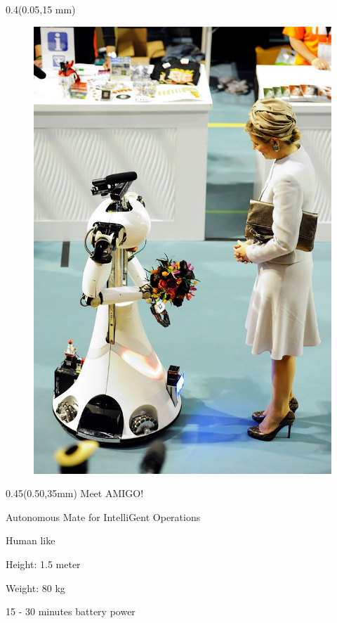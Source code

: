 \documentclass[aspectratio=43]{beamer}
\newcommand{\TULeftMargin}{0.05\paperwidth}
\newcommand{\TULeftWidth}{0.4\paperwidth}
\newcommand{\TURightMargin}{0.50\paperwidth}
\newcommand{\TURightWidth}{0.45\paperwidth}
\begin{document}
	\begin{frame}
	
		\begin{textblock*}{\TULeftWidth}(\TULeftMargin,15	mm)
			\begin{figure}
				\centering
				\includegraphics[width=0.8\linewidth]{[TechUnitedStyle]/Figures/Maxima}
			\end{figure}
		\end{textblock*}
		
		\begin{textblock*}{\TURightWidth}(\TURightMargin,35mm)
			Meet AMIGO! 
			\begin{TechUnitedItems}
				\item Autonomous Mate for IntelliGent Operations
				\item Human like
				\item Height: 1.5 meter
				\item Weight: 80 kg
				\item 15 - 30 minutes battery power
			
			\end{TechUnitedItems}
			
	\end{textblock*}
	
	\end{frame}
\end{document}
